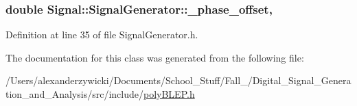 \hypertarget{classSignal_1_1SignalGenerator_a6b4444d46747c8517171edbbf4b5588f}{
\subsubsection[{\+\_\+phase\+\_\+offset}]{\setlength{\rightskip}{0pt plus 5cm}double Signal\+::\+Signal\+Generator\+::\+\_\+phase\+\_\+offset\hspace{0.3cm}{\ttfamily [protected]}, {\ttfamily [inherited]}}}\label{classSignal_1_1SignalGenerator_a6b4444d46747c8517171edbbf4b5588f}


Definition at line 35 of file Signal\+Generator.\+h.



The documentation for this class was generated from the following file\+:\begin{DoxyCompactItemize}
\item 
/\+Users/alexanderzywicki/\+Documents/\+School\+\_\+\+Stuff/\+Fall\+\_/\+Digital\+\_\+\+Signal\+\_\+\+Generation\+\_\+and\+\_\+\+Analysis/src/include/\hyperlink{polyBLEP_8h}{poly\+B\+L\+E\+P.\+h}\end{DoxyCompactItemize}
